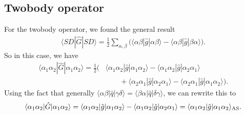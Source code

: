 \documentclass[a4paper, 11pt, notitlepage, english]{article}
\newcommand{\op}[1]{\hat{#1}}
\newcommand{\braopket}[3]{\langle #1 | {#2} | #3 \rangle}
\begin{document}
\subsection*{Twobody operator}
For the twobody operator, we found the general result
\begin{align*}
\braopket{SD}{\op{G}}{SD}
=  \frac{1}{2}\sum_{\alpha,\beta} \bigg(\braopket{\alpha\beta}{\op{g}}{\alpha\beta} - \braopket{\alpha\beta}{\op{g}}{\beta\alpha}\bigg).
\end{align*}
So in this case, we have
\begin{align*}	
\braopket{\alpha_1 \alpha_2}{\op{G}}{\alpha_1 \alpha_2} = \frac{1}{2}\bigg(
&\braopket{\alpha_1\alpha_2}{\op{g}}{\alpha_1\alpha_2} -\braopket{\alpha_1\alpha_2}{\op{g}}{\alpha_2\alpha_1} \\
&\qquad+ \braopket{\alpha_2\alpha_1}{\op{g}}{\alpha_2\alpha_1} - \braopket{\alpha_2\alpha_1}{\op{g}}{\alpha_1\alpha_2} \bigg).
\end{align*}
Using the fact that generally $\braopket{\alpha\beta}{\op{q}}{\gamma\delta} = \braopket{\beta\alpha}{\op{q}}{\delta\gamma}$, we can rewrite this to 
$$\braopket{\alpha_1 \alpha_2}{\op{G}}{\alpha_1 \alpha_2} = 
\braopket{\alpha_1\alpha_2}{\op{g}}{\alpha_1\alpha_2} -\braopket{\alpha_1\alpha_2}{\op{g}}{\alpha_2\alpha_1} = \braopket{\alpha_1\alpha_2}{\op{g}}{\alpha_1\alpha_2}_{\rm AS}.$$
\end{document}
